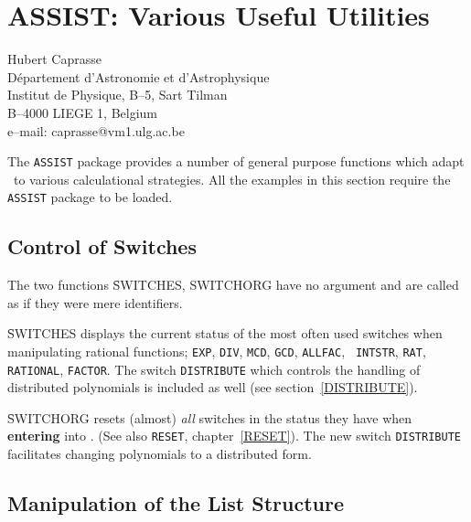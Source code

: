 \chapter{ASSIST: Various Useful Utilities}
\label{ASSIST}

{\footnotesize
\begin{center}
Hubert Caprasse \\
D\'epartement d'Astronomie et d'Astrophysique \\
Institut de Physique, B--5, Sart Tilman \\
B--4000 LIEGE 1, Belgium\\[0.05in]
e--mail: caprasse@vm1.ulg.ac.be
\end{center}
}

The {\tt ASSIST} package provides a number of general
purpose functions which adapt \REDUCE\ to various
calculational strategies.  All the examples in this section require
the {\tt ASSIST} package to be loaded.

\section{Control of Switches}
The two functions \f{SWITCHES, SWITCHORG}
 have no argument and are called
as if they were mere identifiers.

\f{SWITCHES} displays the current status of the most often used switches
when manipulating rational functions;
{\tt EXP}, {\tt DIV}, {\tt MCD}, {\tt GCD}, {\tt ALLFAC}, {\tt
INTSTR}, {\tt RAT}, {\tt RATIONAL}, {\tt FACTOR}.
The switch {\tt DISTRIBUTE} which controls the handling
of distributed polynomials is included as well (see section~\ref{DISTRIBUTE}).

\f{SWITCHORG} resets (almost) {\em all} switches in the status they
have when {\bf entering} into \REDUCE. (See also {\tt RESET},
chapter~\ref{RESET}).  The new switch {\tt DISTRIBUTE}
facilitates changing polynomials to a distributed form.

\section{Manipulation of the List Structure}

